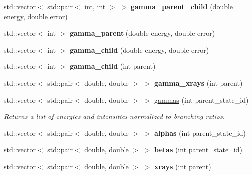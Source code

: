 \begin{DoxyCompactItemize}
\item 
std\+::vector$<$ std\+::pair$<$ int, int $>$ $>$ {\bfseries gamma\+\_\+parent\+\_\+child} (double energy, double error)\hypertarget{namespacepyne_ab57180e1e9e791ab2480cd4875f6330c}{}\label{namespacepyne_ab57180e1e9e791ab2480cd4875f6330c}

\item 
std\+::vector$<$ int $>$ {\bfseries gamma\+\_\+parent} (double energy, double error)\hypertarget{namespacepyne_a94e4481d01e0d9c2f3d34a11ccdd0e4f}{}\label{namespacepyne_a94e4481d01e0d9c2f3d34a11ccdd0e4f}

\item 
std\+::vector$<$ int $>$ {\bfseries gamma\+\_\+child} (double energy, double error)\hypertarget{namespacepyne_acc6c4b51ec74e0bd3383d2724b16a8ef}{}\label{namespacepyne_acc6c4b51ec74e0bd3383d2724b16a8ef}

\item 
std\+::vector$<$ int $>$ {\bfseries gamma\+\_\+child} (int parent)\hypertarget{namespacepyne_af691388c16c1d0c5ddc9a40a74ae8311}{}\label{namespacepyne_af691388c16c1d0c5ddc9a40a74ae8311}

\item 
std\+::vector$<$ std\+::pair$<$ double, double $>$ $>$ {\bfseries gamma\+\_\+xrays} (int parent)\hypertarget{namespacepyne_a0453b68ad87cb9ca636a24000f45c3e6}{}\label{namespacepyne_a0453b68ad87cb9ca636a24000f45c3e6}

\item 
std\+::vector$<$ std\+::pair$<$ double, double $>$ $>$ \hyperlink{namespacepyne_a8eeb397c67e950ae3b78c02a6a09655b}{gammas} (int parent\+\_\+state\+\_\+id)
\begin{DoxyCompactList}\small\item\em Returns a list of energies and intensities normalized to branching ratios. \end{DoxyCompactList}\item 
std\+::vector$<$ std\+::pair$<$ double, double $>$ $>$ {\bfseries alphas} (int parent\+\_\+state\+\_\+id)\hypertarget{namespacepyne_afab6c1fd5c10dd2582c242fc04296e0f}{}\label{namespacepyne_afab6c1fd5c10dd2582c242fc04296e0f}

\item 
std\+::vector$<$ std\+::pair$<$ double, double $>$ $>$ {\bfseries betas} (int parent\+\_\+state\+\_\+id)\hypertarget{namespacepyne_af2c502044eaf54a9b575f66f0e38daa3}{}\label{namespacepyne_af2c502044eaf54a9b575f66f0e38daa3}

\item 
std\+::vector$<$ std\+::pair$<$ double, double $>$ $>$ {\bfseries xrays} (int parent)\hypertarget{namespacepyne_a086ed3576eb51bbdc721fbd5754ecf30}{}\label{namespacepyne_a086ed3576eb51bbdc721fbd5754ecf30}


\end{DoxyCompactItemize}
